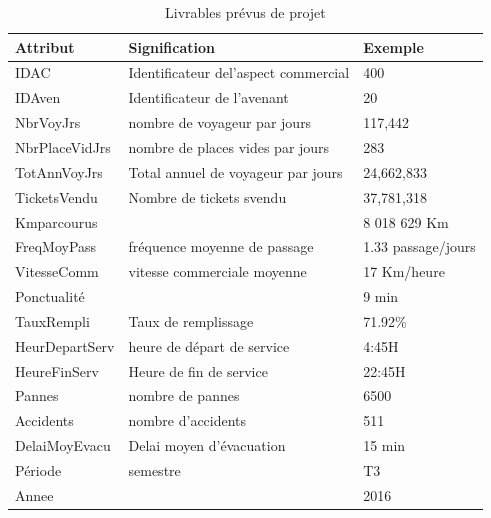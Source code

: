 \documentclass[a4paper]{report}
\begin{document}
\begin{doublespace}
	\begin{table}[H]
		\begin{center}
			\begin{tabularx}{17.5cm}{|X|X|X|}
				\hline
				\textbf{Attribut} & \textbf{Signification}               &
				\textbf{Exemple}                                                        \\
				\hline
				IDAC              & Identificateur del'aspect commercial & 400          \\
				\hline
				IDAven            & Identificateur de l'avenant          & 20           \\
				\hline
				NbrVoyJrs         & nombre de voyageur par jours         & 117,442      \\
				\hline
				NbrPlaceVidJrs    & nombre de places vides par jours     &
				283                                                                     \\
				\hline
				TotAnnVoyJrs      & Total annuel de voyageur par jours   &
				24,662,833                                                              \\
				\hline
				TicketsVendu      & Nombre de tickets svendu             & 37,781,318   \\
				\hline
				Kmparcourus       &                                      & 8 018 629 Km \\
				\hline
				FreqMoyPass       & fréquence moyenne de passage         & 1.33
				passage/jours                                                           \\
				\hline
				VitesseComm       & vitesse commerciale moyenne          & 17
				Km/heure                                                                \\
				\hline
				Ponctualité       &                                      & 9 min        \\
				\hline
				TauxRempli        & Taux de remplissage                  & 71.92\%      \\
				\hline
				HeurDepartServ    & heure de départ de service           & 4:45H        \\
				\hline
				HeureFinServ      & Heure de fin de service              & 22:45H       \\
				\hline
				Pannes            & nombre de pannes                     & 6500         \\
				\hline
				Accidents         & nombre d'accidents                   & 511          \\
				\hline
				DelaiMoyEvacu     & Delai moyen d'évacuation             & 15 min       \\
				\hline
				Période           & semestre                             & T3           \\
				\hline
				Annee             &                                      & 2016         \\
				\hline
			\end{tabularx}
			\caption{Livrables prévus de projet}
		\end{center}
	\end{table}


\end{doublespace}
\end{document}

